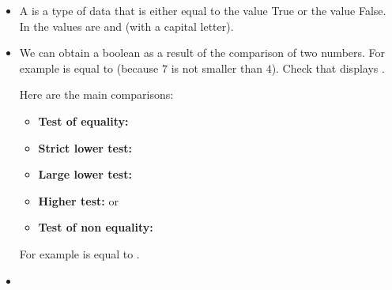 \documentclass[11pt,class=report,crop=false]{standalone}
\begin{document}

\begin{cours}[Booleans]
\sauteligne
\begin{itemize}
  \item A  is a type of data that is either equal to the value \og{}True\fg{} or the value \og{}False\fg{}. In \Python{} the values are  and  (with a capital letter).
  
  \item We can obtain a boolean as a result of the comparison of two numbers.
  For example  is equal to  (because $7$ is not smaller than $4$). 
  Check that  displays .
  
  Here are the main comparisons:
  \begin{itemize}
    \item \textbf{Test of equality:}\quad {}\index{\ci{==}}
    	\item \textbf{Strict lower test:}\quad {}
    	\item \textbf{Large lower test:}\quad {}\index{\ci{<=}}
    	\item \textbf{Higher test:}\quad {} \quad or \quad {}\index{\ci{>=}}
    	\item \textbf{Test of non equality:}\quad {}
  \end{itemize}
   
   For example  is equal to .
   

   
   
   \item ~
   

\end{itemize}
\end{cours}
\end{document}
